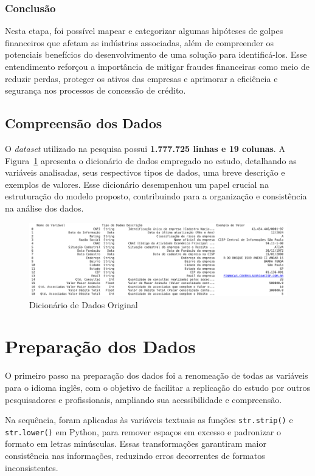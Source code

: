 \documentclass[12pt,a4paper]{article}
\begin{document}
\subsubsection{Conclusão}
Nesta etapa, foi possível mapear e categorizar algumas hipóteses de golpes financeiros que afetam as indústrias associadas, além de compreender os potenciais benefícios do desenvolvimento de uma solução para identificá-los. Esse entendimento reforçou a importância de mitigar fraudes financeiras como meio de reduzir perdas, proteger os ativos das empresas e aprimorar a eficiência e segurança nos processos de concessão de crédito.
\subsection{Compreensão dos Dados}

O \textit{dataset} utilizado na pesquisa possui \textbf{1.777.725 linhas e 19 colunas}. A Figura~\ref{fig:dicionario_dados} apresenta o dicionário de dados empregado no estudo, detalhando as variáveis analisadas, seus respectivos tipos de dados, uma breve descrição e exemplos de valores. Esse dicionário desempenhou um papel crucial na estruturação do modelo proposto, contribuindo para a organização e consistência na análise dos dados.

\begin{figure}
    \centering
    \includegraphics[width=\textwidth]{dicionariodedados.png}
    \caption{Dicionário de Dados Original}
    \label{fig:dicionario_dados}
\end{figure}

\section{Preparação dos Dados}

O primeiro passo na preparação dos dados foi a renomeação de todas as variáveis para o idioma inglês, com o objetivo de facilitar a replicação do estudo por outros pesquisadores e profissionais, ampliando sua acessibilidade e compreensão.

Na sequência, foram aplicadas às variáveis textuais as funções \texttt{str.strip()} e \texttt{str.lower()} em Python, para remover espaços em excesso e padronizar o formato em letras minúsculas. Essas transformações garantiram maior consistência nas informações, reduzindo erros decorrentes de formatos inconsistentes.
\end{document}
